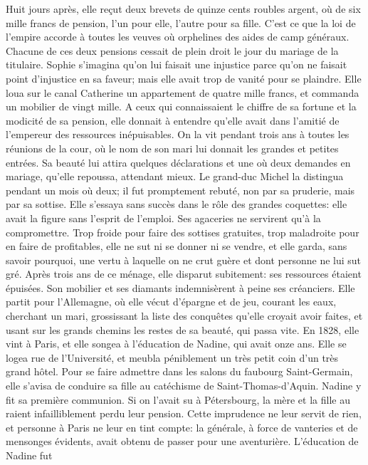 Huit jours après, elle reçut deux brevets de quinze cents roubles
argent, où de six mille francs de pension, l'un pour elle, l'autre pour
sa fille. C'est ce que la loi de l'empire accorde à toutes les veuves où
orphelines des aides de camp généraux. Chacune de ces deux pensions
cessait de plein droit le jour du mariage de la titulaire. Sophie
s'imagina qu'on lui faisait une injustice parce qu'on ne faisait point
d'injustice en sa faveur; mais elle avait trop de vanité pour se
plaindre. Elle loua sur le canal Catherine un appartement de quatre
mille francs, et commanda un mobilier de vingt mille. A ceux qui
connaissaient le chiffre de sa fortune et la modicité de sa pension,
elle donnait à entendre qu'elle avait dans l'amitié de l'empereur des
ressources inépuisables. On la vit pendant trois ans à toutes les
réunions de la cour, où le nom de son mari lui donnait les grandes et
petites entrées. Sa beauté lui attira quelques déclarations et une où
deux demandes en mariage, qu'elle repoussa, attendant mieux. Le
grand-duc Michel la distingua pendant un mois où deux; il fut
promptement rebuté, non par sa pruderie, mais par sa sottise. Elle
s'essaya sans succès dans le rôle des grandes coquettes: elle avait la
figure sans l'esprit de l'emploi. Ses agaceries ne servirent qu'à la
compromettre. Trop froide pour faire des sottises gratuites, trop
maladroite pour en faire de profitables, elle ne sut ni se donner ni se
vendre, et elle garda, sans savoir pourquoi, une vertu à laquelle on ne
crut guère et dont personne ne lui sut gré. Après trois ans de ce
ménage, elle disparut subitement: ses ressources étaient épuisées. Son
mobilier et ses diamants indemnisèrent à peine ses créanciers. Elle
partit pour l'Allemagne, où elle vécut d'épargne et de jeu, courant les
eaux, cherchant un mari, grossissant la liste des conquêtes qu'elle
croyait avoir faites, et usant sur les grands chemins les restes de sa
beauté, qui passa vite. En 1828, elle vint à Paris, et elle songea à
l'éducation de Nadine, qui avait onze ans. Elle se logea rue de
l'Université, et meubla péniblement un très petit coin d'un très grand
hôtel. Pour se faire admettre dans les salons du faubourg Saint-Germain,
elle s'avisa de conduire sa fille au catéchisme de Saint-Thomas-d'Aquin.
Nadine y fit sa première communion. Si on l'avait su à Pétersbourg, la
mère et la fille au raient infailliblement perdu leur pension. Cette
imprudence ne leur servit de rien, et personne à Paris ne leur en tint
compte: la générale, à force de vanteries et de mensonges évidents,
avait obtenu de passer pour une aventurière. L'éducation de Nadine fut
